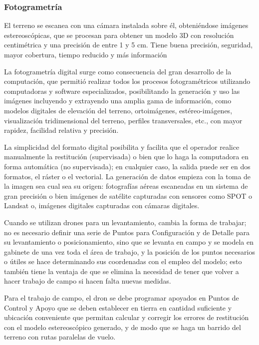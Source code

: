 \subsubsection{Fotogrametría}

El terreno se escanea con una cámara instalada sobre él, obteniéndose imágenes estereoscópicas, que se procesan para obtener un modelo 3D con resolución centimétrica y una precisión de entre 1 y 5 cm. Tiene buena precisión, seguridad, mayor cobertura, tiempo reducido y más información

La fotogrametría digital surge como consecuencia del gran desarrollo de la computación, que permitió realizar todos los procesos fotogramétricos utilizando computadoras y software especializados, posibilitando la generación y uso las imágenes incluyendo y extrayendo una amplia gama de información, como modelos digitales de elevación del terreno, ortoimágenes, estéreo-imágenes, visualización tridimensional del terreno, perfiles transversales, etc., con mayor rapidez, facilidad relativa y precisión. 

La simplicidad del formato digital posibilita y facilita que el operador realice manualmente la restitución (supervisada) o bien que lo haga la computadora en forma automática (no supervisada); en cualquier caso, la salida puede ser en dos formatos, el ráster o el vectorial. La generación de datos empieza con la toma de la imagen sea cual sea su origen: fotografías aéreas escaneadas en un sistema de gran precisión o bien imágenes de satélite capturadas con sensores como SPOT o Landsat o, imágenes digitales capturadas con cámaras digitales.

Cuando se utilizan drones para un levantamiento, cambia la forma de trabajar; no es necesario definir una serie de Puntos para Configuración y de Detalle para su levantamiento o posicionamiento, sino que se levanta en campo y se modela en gabinete de una vez toda el área de trabajo, y la posición de los puntos necesarios o útiles se hace determinando sus coordenadas con el empleo del modelo; esto también tiene la ventaja de que se elimina la necesidad de tener que volver a hacer trabajo de campo si hacen falta nuevas medidas.

Para el trabajo de campo, el dron se debe programar apoyados en Puntos de Control y Apoyo que se deben establecer en tierra en cantidad suficiente y ubicación conveniente que permitan calcular y corregir los errores de restitución con el modelo estereoscópico generado, y de modo que se haga un barrido del terreno con rutas paralelas de vuelo.

